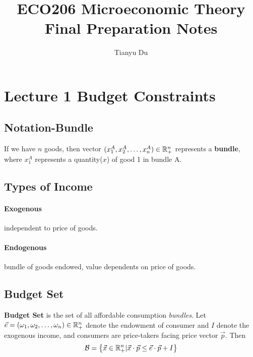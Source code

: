 \documentclass[]{article}
\title{ECO206 Microeconomic Theory \\ \small Final Preparation Notes}
\author{Tianyu Du}
\begin{document}
    \maketitle
    \doclicenseThis
    \tableofcontents

    \section{Lecture 1 Budget Constraints}
    
        \subsection{Notation-Bundle}
            \begin{definition}
                If we have $n$ goods, then vector $(x_1^A, x_2^A, \dots, x_n^A) \in \mathbb{R}^n_+$ represents a \textbf{bundle}, where $x_1^A$ represents a quantity($x$) of good 1 in bundle A. 
            \end{definition}
            
        \subsection{Types of Income}
            \paragraph{Exogenous}independent to price of goods.
            \paragraph{Endogenous}bundle of goods endowed, value dependents on price of goods.
            
        \subsection{Budget Set}
            \begin{definition}
                \textbf{Budget Set} is the set of all affordable consumption \emph{bundles}. Let $\vec{e}=(\omega_1,\omega_2,\dots,\omega_n) \in \mathbb{R}^n_+$ denote the endowment of consumer and $I$ denote the exogenous income, and consumers are price-takers facing price vector $\vec{p}$. Then
                \[
                    \mathcal{B} = \big\{\vec{x}\in \mathbb{R}^n_+ \vert \vec{x}\cdot\vec{p} \leq \vec{e}\cdot\vec{p} + I  \big\}
                \]
            \end{definition}
            
\end{document}
